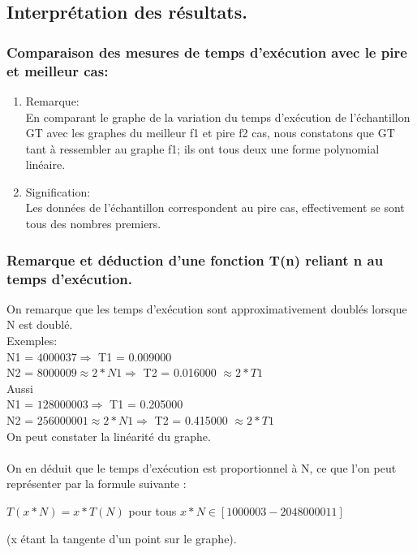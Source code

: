 \documentclass[12pt]{article}
\begin{document}
\subsection{Interprétation des résultats.}
\subsubsection{Comparaison des mesures de temps d'exécution avec le pire et meilleur cas:}
\begin{enumerate}
	\item Remarque: \\
	En comparant le graphe de la variation du temps d'exécution de l'échantillon GT avec les graphes du meilleur f1 et pire f2 cas, nous constatons que GT tant à ressembler au graphe f1; ils ont tous deux une forme polynomial linéaire.
	\\
	  

	\item Signification:
	\\
	Les données de l'échantillon correspondent au pire cas, effectivement se sont tous des nombres premiers.
	

\end{enumerate}

\subsubsection{Remarque et déduction d'une fonction T(n) reliant n au temps d'exécution.}


On remarque que les temps d'exécution sont approximativement doublés lorsque N est doublé.
\\

\color{blue}
Exemples:
\color{black} 
\\
N1 = $4000037  \Rightarrow  $  T1 = 0.009000
\\
N2 = $8000009 \approx 2 * N1  \Rightarrow  $  T2 = 0.016000 $\approx 2 * T1 $
\\

Aussi
\\
N1 = $128000003 \Rightarrow $  T1 = 0.205000
\\
N2 = $256000001 \approx 2 * N1 \Rightarrow $  T2 = 0.415000 $\approx 2 * T1 $
\\

On peut constater la linéarité du graphe. 
\\
\\
On en déduit que le temps d'exécution est proportionnel à N, ce que l'on peut représenter par la formule suivante
: 
\begin{center}
\color{blue}
	$T(x*N) = x*T(N)$ pour tous $ x*N \in [1000003 - 2048000011] $	
	
\color{black}
(x étant la tangente d'un point sur le graphe).
\end{center}
\end{document}
